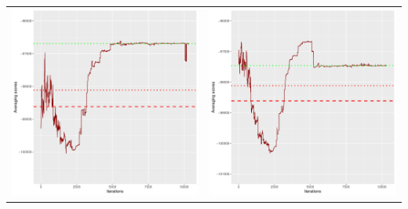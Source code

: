 \documentclass[]{scrartcl}
\begin{document}
\begin{table}[h!]
\begin{tabular}{cc}
\includegraphics[scale = 0.4]{./figs/hepar2/v5/25/avgBoundsEvolution-10352.pdf} & 
\includegraphics[scale = 0.4]{./figs/hepar2/v5/50/avgBoundsEvolution-10352.pdf} \\

\end{tabular}
\end{table}
\end{document}
